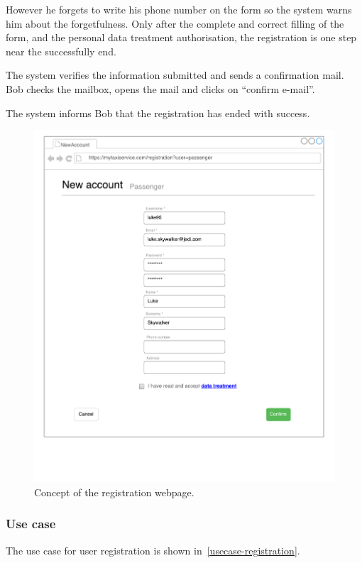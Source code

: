 However he forgets to write his phone number on the form so the system warns him about the forgetfulness.
Only after the complete and correct filling of the form, and the personal data treatment authorisation, the registration is one step near the successfully end.

The system verifies the information submitted and sends a confirmation mail.
Bob checks the mailbox, opens the mail and clicks on ``confirm e-mail''.

The system informs Bob that the registration has ended with success.

\begin{figure}
\includegraphics[width=\textwidth]{mockup/Registration.pdf}
\caption{Concept of the registration webpage.}
\label{fig:mockup-registration}
\end{figure}


\subsubsection{Use case}
The use case for user registration is shown in~\autoref{usecase-registration}.

